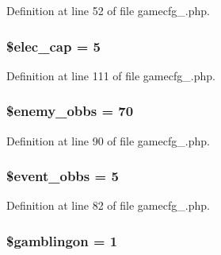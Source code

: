 Definition at line 52 of file gamecfg\+\_.\+php.

\hypertarget{gamecfg__1_8php_a39619187fb922174267c2afe66e28572}{
\subsubsection[{\$elec\+\_\+cap}]{\setlength{\rightskip}{0pt plus 5cm}\$elec\+\_\+cap = 5}}\label{gamecfg__1_8php_a39619187fb922174267c2afe66e28572}


Definition at line 111 of file gamecfg\+\_.\+php.

\hypertarget{gamecfg__1_8php_a96c4f1ea70365ee6aebfe4bc493599f1}{
\subsubsection[{\$enemy\+\_\+obbs}]{\setlength{\rightskip}{0pt plus 5cm}\$enemy\+\_\+obbs = 70}}\label{gamecfg__1_8php_a96c4f1ea70365ee6aebfe4bc493599f1}


Definition at line 90 of file gamecfg\+\_.\+php.

\hypertarget{gamecfg__1_8php_ad937694bd38899ea72bd58d97d5e0cd3}{
\subsubsection[{\$event\+\_\+obbs}]{\setlength{\rightskip}{0pt plus 5cm}\$event\+\_\+obbs = 5}}\label{gamecfg__1_8php_ad937694bd38899ea72bd58d97d5e0cd3}


Definition at line 82 of file gamecfg\+\_.\+php.

\hypertarget{gamecfg__1_8php_ab3da51971e8638486cf5d6ca36c804b0}{
\subsubsection[{\$gamblingon}]{\setlength{\rightskip}{0pt plus 5cm}\$gamblingon = 1}}\label{gamecfg__1_8php_ab3da51971e8638486cf5d6ca36c804b0}


